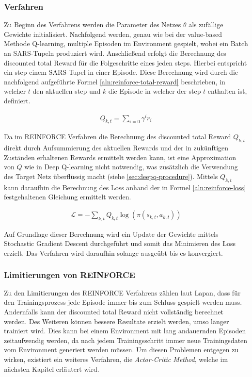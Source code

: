 \documentclass[11pt]{scrartcl}
\begin{document}
\subsubsection{Verfahren}
Zu Beginn des Verfahrens werden die Parameter des Netzes $\theta$ als zufällige Gewichte
initialisiert. Nachfolgend werden, genau wie bei der value-based Methode Q-learning,
multiple Episoden im Environment gespielt, wobei ein Batch an SARS-Tupeln produziert wird.
Anschließend erfolgt die Berechnung des discounted total Reward für die Folgeschritte eines
jeden steps. Hierbei entspricht ein step einem SARS-Tupel in einer Episode. Diese Berechnung
wird durch die nachfolgend aufgeführte Formel \ref{aln:reinforce-total-reward} beschrieben,
in welcher $t$ den aktuellen step und $k$ die Episode in welcher der step $t$ enthalten
ist, definiert. 

\begin{align}
Q_{k,t}=\sum_{i=0} \gamma^{i}r_{i}
\label{aln:reinforce-total-reward}
\end{align}

Da im REINFORCE Verfahren die Berechnung des discounted total Reward $Q_{k,t}$ direkt durch
Aufsummierung des aktuellen Rewards und der in zukünftigen Zuständen erhaltenen Rewards
ermittelt werden kann, ist eine Approximation von $Q$ wie in Deep Q-learning nicht notwendig,
was zusätzlich die Verwendung des Target Netz überflüssig macht (siehe 
\autoref{sec:deepq-procedure}). Mittels $Q_{k,t}$ kann daraufhin die Berechnung des Loss
anhand der in Formel \ref{aln:reinforce-loss} festgehaltenen Gleichung ermittelt werden.

\begin{align}
\mathcal{L}=-\sum_{k,t}Q_{k,t}\log(\pi(s_{k,t},a_{k,t}))
\label{aln:reinforce-loss}
\end{align}

Auf Grundlage dieser Berechnung wird ein Update der Gewichte mittels Stochastic
Gradient Descent durchgeführt und somit das Minimieren des Loss erzielt. Das Verfahren
wird daraufhin solange ausgeübt bis es konvergiert.

\subsubsection{Limitierungen von REINFORCE}
\label{sec:limit-reinforce}
Zu den Limitierungen des REINFORCE Verfahrens zählen laut Lapan\cite[~S.252]{L2018}, dass für den
Trainingsprozess jede Episode immer bis zum Schluss gespielt werden muss. Andernfalls kann der
discounted total Reward nicht vollständig berechnet werden. Des Weiteren können bessere Resultate
erzielt werden, umso länger trainiert wird. Dies kann bei einem Environment mit lang andauernden
Episoden zeitaufwendig werden, da nach jedem Trainingsschritt immer neue Trainingsdaten vom
Environment generiert werden müssen. Um diesen Problemen entgegen zu wirken, existiert ein weiteres
Verfahren, die \textit{Actor-Critic Method}, welche im nächsten Kapitel erläutert wird. 
\end{document}
